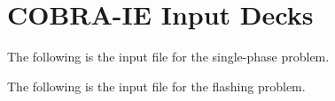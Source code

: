 \chapter{COBRA-IE Input Decks}
\label{app:input_decks}

The following is the \cobra{} input file for the single-phase problem.
{\small }

\pagebreak
The following is the \cobra{} input file for the flashing problem.
{\small }